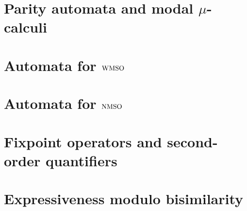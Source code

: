 \documentclass[prodmode,acmtecs]{acmsmall} %
\begin{document}
\section{Parity automata and modal $\mu$-calculi}\label{sec:parityaut}


\clearpage

\section{Automata for $\mathrm{WMSO}$}\label{sec:autwmso}

\clearpage

\section{Automata for $\mathrm{NMSO}$}\label{sec:autnmso}

\clearpage

\section{Fixpoint operators and second-order quantifiers}


\clearpage

\clearpage

\section{Expressiveness modulo bisimilarity}\label{sec:expresso}






\end{document}
